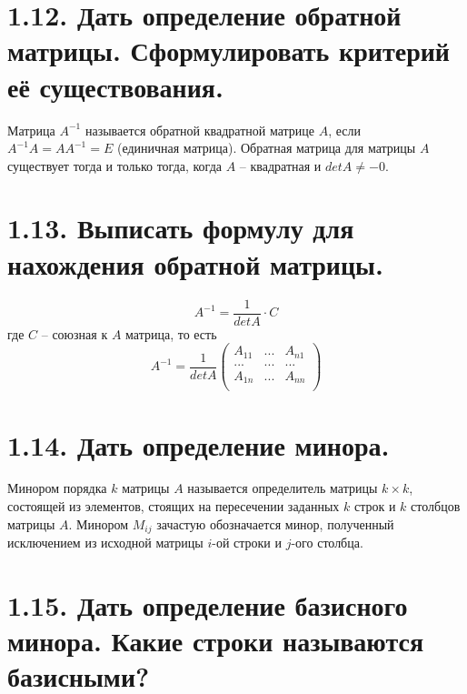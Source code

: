 \documentclass{article}
\begin{document}
\section*{\LARGE 1.12. Дать определение обратной матрицы. Сформулировать критерий её существования. }

Матрица $A^{-1}$ называется обратной квадратной матрице $A$, если $A^{-1}A = AA^{-1} = E$ (единичная матрица). Обратная матрица для матрицы $A$ существует тогда и только тогда, когда $A$ -- квадратная и $detA \ne -0$.

\section*{\LARGE 1.13. Выписать формулу для нахождения обратной матрицы. }

$$
A^{-1} = \frac{1}{detA}\cdot C
$$
где $C$ -- союзная к $A$ матрица, то есть 
$$
A^{-1} = \frac{1}{detA}
\begin{pmatrix}
A_{11} & ... & A_{n1} \\
... & ... & ... \\
A_{1n} & ... & A_{nn} \\
\end{pmatrix}
$$

\section*{\LARGE 1.14. Дать определение минора. }

Минором порядка $k$ матрицы $A$ называется определитель матрицы $k \times k$, состоящей из элементов, стоящих на пересечении заданных $k$ строк и $k$ столбцов матрицы $A$.
\newline Минором $M_{ij}$ зачастую обозначается минор, полученный исключением из исходной матрицы $i$-ой строки и $j$-ого столбца. 

\section*{\LARGE 1.15. Дать определение базисного минора. Какие строки называются базисными?  }
\end{document}
